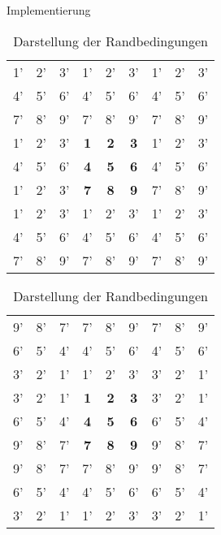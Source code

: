 \documentclass[runningheads]{llncs}
\begin{document}
\begin{section}{Implementierung}
            \begin{table}
                \centering
                \caption{Darstellung der Randbedingungen}
                \label{randbedingungen}
                \begin{tabular}{ | c c c | c c c | c c c | }
                    \hline
                    1' & 2' & 3' & 1' & 2' & 3' & 1' & 2' & 3' \\
                    4' & 5' & 6' & 4' & 5' & 6' & 4' & 5' & 6' \\
                    7' & 8' & 9' & 7' & 8' & 9' & 7' & 8' & 9' \\
                    \hline
                    1' & 2' & 3' & \textbf{1}  & \textbf{2}  & \textbf{3}  & 1' & 2' & 3' \\
                    4' & 5' & 6' & \textbf{4}  & \textbf{5}  & \textbf{6}  & 4' & 5' & 6' \\
                    1' & 2' & 3' & \textbf{7}  & \textbf{8}  & \textbf{9}  & 7' & 8' & 9' \\
                    \hline
                    1' & 2' & 3' & 1' & 2' & 3' & 1' & 2' & 3' \\
                    4' & 5' & 6' & 4' & 5' & 6' & 4' & 5' & 6' \\
                    7' & 8' & 9' & 7' & 8' & 9' & 7' & 8' & 9' \\
                    \hline
                \end{tabular}
                \begin{tabular}{ | c c c | c c c | c c c | }
                    \hline
                    9' & 8' & 7' & 7' & 8' & 9' & 7' & 8' & 9' \\
                    6' & 5' & 4' & 4' & 5' & 6' & 4' & 5' & 6' \\
                    3' & 2' & 1' & 1' & 2' & 3' & 3' & 2' & 1' \\
                    \hline
                    3' & 2' & 1' & \textbf{1}  & \textbf{2}  & \textbf{3}  & 3' & 2' & 1' \\
                    6' & 5' & 4' & \textbf{4}  & \textbf{5}  & \textbf{6}  & 6' & 5' & 4' \\
                    9' & 8' & 7' & \textbf{7}  & \textbf{8}  & \textbf{9}  & 9' & 8' & 7' \\
                    \hline
                    9' & 8' & 7' & 7' & 8' & 9' & 9' & 8' & 7' \\
                    6' & 5' & 4' & 4' & 5' & 6' & 6' & 5' & 4' \\
                    3' & 2' & 1' & 1' & 2' & 3' & 3' & 2' & 1' \\
                    \hline
                \end{tabular}
            \end{table}


\end{section}
\end{document}
